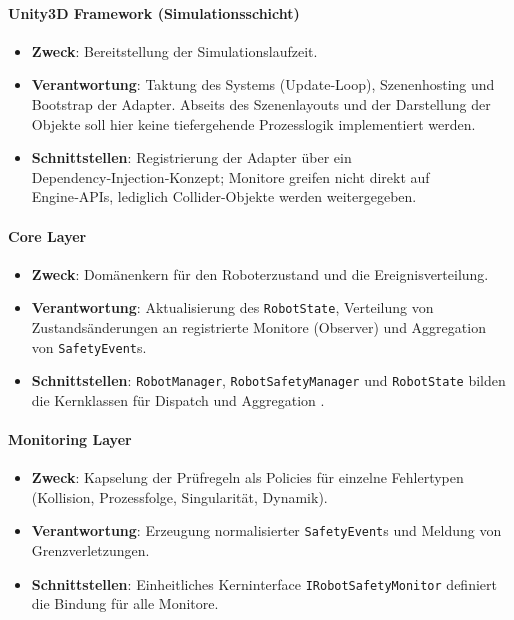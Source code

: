 
\paragraph{Unity3D Framework (Simulationsschicht)}
\begin{itemize}
	\item \textbf{Zweck}: Bereitstellung der Simulationslaufzeit.
	\item \textbf{Verantwortung}: Taktung des Systems (Update‑Loop), Szenenhosting und Bootstrap der Adapter. Abseits des Szenenlayouts und der Darstellung der Objekte soll hier keine tiefergehende Prozesslogik implementiert werden.
	\item \textbf{Schnittstellen}: Registrierung der Adapter über ein Dependency‑Injection‑Konzept; Monitore greifen nicht direkt auf Engine‑APIs, lediglich Collider-Objekte werden weitergegeben.
\end{itemize}

\paragraph{Core Layer}
\begin{itemize}
	\item \textbf{Zweck}: Domänenkern für den Roboterzustand und die Ereignisverteilung.
	\item \textbf{Verantwortung}: Aktualisierung des \texttt{RobotState}, Verteilung von Zustandsänderungen an registrierte Monitore (Observer) und Aggregation von \texttt{SafetyEvent}s.
	\item \textbf{Schnittstellen}: \texttt{RobotManager}, \texttt{RobotSafetyManager} und \texttt{RobotState} bilden die Kernklassen für Dispatch und Aggregation .
\end{itemize}

\paragraph{Monitoring Layer}
\begin{itemize}
	\item \textbf{Zweck}: Kapselung der Prüfregeln als Policies für einzelne Fehlertypen (Kollision, Prozessfolge, Singularität, Dynamik).
	\item \textbf{Verantwortung}: Erzeugung normalisierter \texttt{SafetyEvent}s und Meldung von Grenzverletzungen.
	\item \textbf{Schnittstellen}: Einheitliches Kerninterface \texttt{IRobotSafetyMonitor} definiert die Bindung für alle Monitore.
\end{itemize}

